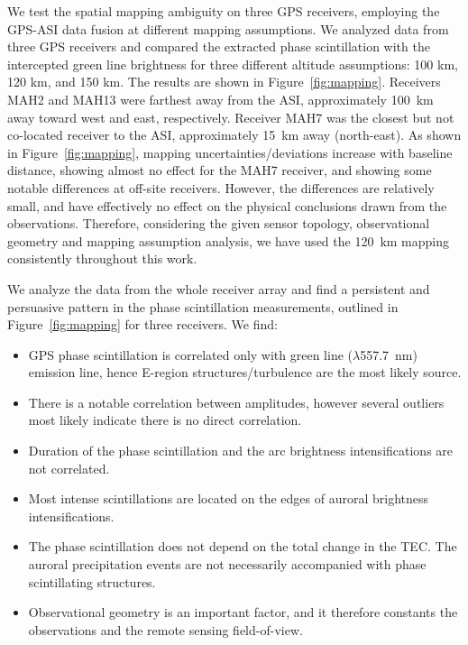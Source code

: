\documentclass[letterpaper,12pt]{article}
\begin{document}
We test the spatial mapping ambiguity on three GPS receivers, employing the GPS-ASI data fusion at different mapping assumptions. We analyzed data from three GPS receivers and compared the extracted phase scintillation with the intercepted green line brightness for three different altitude assumptions: 100 km, 120 km, and 150 km. The results are shown in Figure~\ref{fig:mapping}. Receivers MAH2 and MAH13 were farthest away from the ASI, approximately 100~km away toward west and east, respectively. Receiver MAH7 was the closest but not co-located receiver to the ASI, approximately 15~km away (north-east). As shown in Figure~\ref{fig:mapping}, mapping uncertainties/deviations increase with baseline distance, showing almost no effect for the MAH7 receiver, and showing some notable differences at off-site receivers. However, the differences are relatively small, and have effectively no effect on the physical conclusions drawn from the observations. Therefore, considering the given sensor topology, observational geometry and mapping assumption analysis, we have used the 120~km mapping consistently throughout this work.

We analyze the data from the whole receiver array and find a persistent and persuasive pattern in the phase scintillation measurements, outlined in Figure~\ref{fig:mapping} for three receivers.
We find: 
\begin{itemize}[leftmargin=*]
\vspace{-0.5em}
\item GPS phase scintillation is correlated only with green line ($\lambda$557.7~nm) emission line, hence E-region structures/turbulence are the most likely source.
\vspace{-0.5em}
\item There is a notable correlation between amplitudes, however several outliers most likely indicate there is no direct correlation.
\vspace{-0.5em}
\item Duration of the phase scintillation and the arc brightness intensifications are not correlated.
\vspace{-0.5em}
\item Most intense scintillations are located on the edges of auroral brightness intensifications.
\vspace{-0.5em}
\item The phase scintillation does not depend on the total change in the TEC. The auroral precipitation events are not necessarily accompanied with phase scintillating structures. 
\vspace{-0.5em}
\item Observational geometry is an important factor, and it therefore constants the observations and the remote sensing field-of-view.
\end{itemize}
\end{document}

